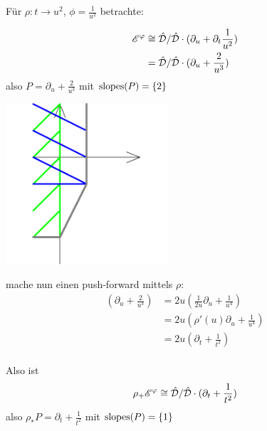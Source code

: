 \begin{exmp}
  Für $\rho:t\rightarrow u^2$, $\phi=\frac{1}{u^2}$ betrachte:\\
  \begin{minipage}[hbt]{0,39\textwidth}
    \begin{align*}
      \mathscr{E}^\varphi &\cong\hat{\mathcal{D}}/\hat{\mathcal{D}}\cdot(\partial_u+\partial_t\frac{1}{u^2})\\
               &= \hat{\mathcal{D}}/\hat{\mathcal{D}}\cdot (\partial_u+\frac{2}{u^3})
    \end{align*}
    also $P=\partial_u+\frac{2}{u^3}$
    mit $ \operatorname{slopes}(P)=\{2\} $
  \end{minipage}
  \begin{minipage}[hbt]{0,59\textwidth}
    \begin{center}
      \includegraphics[width=6cm]{img/pf-start.png}
    \end{center}
  \end{minipage}
  mache nun einen push-forward mittels $\rho$:
  \begin{align*}
    (\partial_u+\frac{2}{u^3}) &= 2u(\frac{1}{2u}\partial_u+\frac{1}{u^4}) \\
                               &= 2u(\rho'(u)\partial_u+\frac{1}{u^4}) \\
                               &= 2u(\partial_t+\frac{1}{t^2})\\
  \end{align*}
  \begin{minipage}[hbt]{0,39\textwidth}
    Also ist
    \begin{align*}
      \rho_+\mathscr{E}^\varphi\cong \hat{\mathcal{D}}/\hat{\mathcal{D}}\cdot(\partial_t+\frac{1}{t^2})
    \end{align*}
    also $\rho_*P=\partial_t+\frac{1}{t^2}$
    mit $ \operatorname{slopes}(P)=\{1\} $
  \end{minipage}
  \begin{minipage}[hbt]{0,59\textwidth}

\end{minipage}
\end{exmp}
